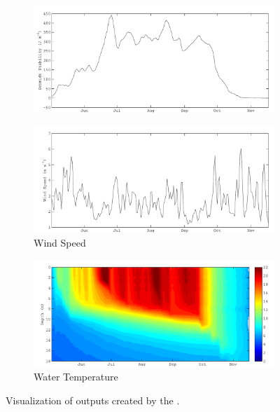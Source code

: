 \begin{figure}
\begin{subfigure}{\lafigsize}
    \includegraphics[width = \linewidth]{figures/Sparkling_St.pdf}
  \end{subfigure}
  \begin{subfigure}{\lafigsize}
    \caption{\label{fig:la:out:wndSpd}Wind Speed}
    \includegraphics[width = \linewidth]{figures/Sparkling_wndSpd.pdf}
  \end{subfigure}
  \begin{subfigure}{\lafigsize}
    \caption{\label{fig:la:out:wTemp}Water Temperature}
    \includegraphics[width = \linewidth]{figures/Sparkling_wTemp.pdf}
  \end{subfigure}
  \caption{\label{fig:la:outputs:2}Visualization of outputs created by the \la.}
\end{figure}